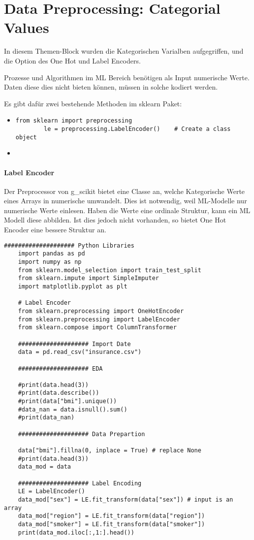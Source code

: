 \section{Data Preprocessing: Categorial Values}
In diesem Themen-Block wurden die Kategorischen Varialben aufgegriffen, und die Option des One Hot und Label Encoders.

Prozesse und Algorithmen im \gls{ML} Bereich benötigen als Input numerische Werte. Daten diese dies nicht bieten können, müssen in solche kodiert werden.

Es gibt dafür zwei bestehende Methoden im sklearn Paket:
\begin{itemize}
	\item 
	\begin{lstlisting}[style=python]
		from sklearn import preprocessing
		le = preprocessing.LabelEncoder()	 # Create a class object
	\end{lstlisting}
	\item 
	\begin{lstlisting}[style=python]
		
	\end{lstlisting}
\end{itemize}

\paragraph{Label Encoder}
Der Preprocessor von \gls{g_scikit} bietet eine Classe an, welche Kategorische Werte eines Arrays in numerische umwandelt.
Dies ist notwendig, weil ML-Modelle nur numerische Werte einlesen.
Haben die Werte eine ordinale Struktur, kann ein ML Modell diese abbilden. Ist dies jedoch nicht vorhanden, so bietet One Hot Encoder eine bessere Struktur an.

\begin{lstlisting}[style=python]
	#################### Python Libraries
	import pandas as pd
	import numpy as np
	from sklearn.model_selection import train_test_split
	from sklearn.impute import SimpleImputer
	import matplotlib.pyplot as plt
	
	# Label Encoder
	from sklearn.preprocessing import OneHotEncoder
	from sklearn.preprocessing import LabelEncoder
	from sklearn.compose import ColumnTransformer
	
	#################### Import Date
	data = pd.read_csv("insurance.csv")
	
	#################### EDA
	
	#print(data.head(3))
	#print(data.describe())
	#print(data["bmi"].unique())
	#data_nan = data.isnull().sum()
	#print(data_nan)
	
	#################### Data Prepartion
	
	data["bmi"].fillna(0, inplace = True) # replace None
	#print(data.head(3))
	data_mod = data
	
	#################### Label Encoding
	LE = LabelEncoder()
	data_mod["sex"] = LE.fit_transform(data["sex"]) # input is an array
	data_mod["region"] = LE.fit_transform(data["region"])
	data_mod["smoker"] = LE.fit_transform(data["smoker"])
	print(data_mod.iloc[:,1:].head())	
\end{lstlisting}

